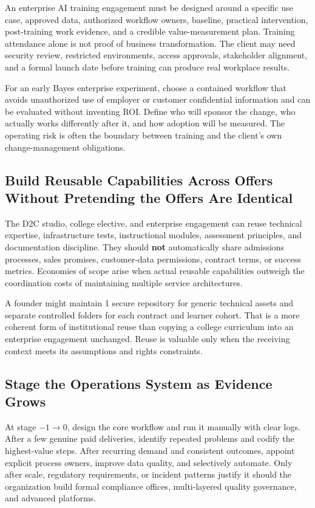 An enterprise AI training engagement must be designed around a specific use case, approved data, authorized workflow owners, baseline, practical intervention, post-training work evidence, and a credible value-measurement plan. Training attendance alone is not proof of business transformation. The client may need security review, restricted environments, access approvals, stakeholder alignment, and a formal launch date before training can produce real workplace results.

For an early Bayes enterprise experiment, choose a contained workflow that avoids unauthorized use of employer or customer confidential information and can be evaluated without inventing ROI. Define who will sponsor the change, who actually works differently after it, and how adoption will be measured. The operating risk is often the boundary between training and the client's own change-management obligations.

\subsection{Build Reusable Capabilities Across Offers Without Pretending the Offers Are Identical}
\label{sec:bayes_reusable_capabilities}

The D2C studio, college elective, and enterprise engagement can reuse technical expertise, infrastructure tests, instructional modules, assessment principles, and documentation discipline. They should \textbf{not} automatically share admissions processes, sales promises, customer-data permissions, contract terms, or success metrics. Economies of scope arise when actual reusable capabilities outweigh the coordination costs of maintaining multiple service architectures.

A founder might maintain 1 secure repository for generic technical assets and separate controlled folders for each contract and learner cohort. That is a more coherent form of institutional reuse than copying a college curriculum into an enterprise engagement unchanged. Reuse is valuable only when the receiving context meets its assumptions and rights constraints.

\subsection{Stage the Operations System as Evidence Grows}
\label{sec:bayes_stage_operations}

At stage $-1 \rightarrow 0$, design the core workflow and run it manually with clear logs. After a few genuine paid deliveries, identify repeated problems and codify the highest-value steps. After recurring demand and consistent outcomes, appoint explicit process owners, improve data quality, and selectively automate. Only after scale, regulatory requirements, or incident patterns justify it should the organization build formal compliance offices, multi-layered quality governance, and advanced platforms.


